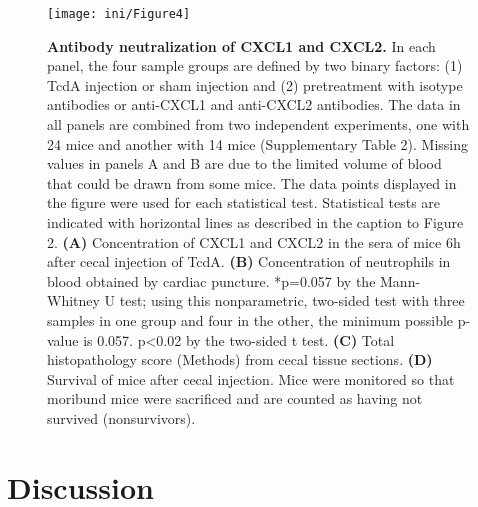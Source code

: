 \begin{figure}[h!]
  \centering
  \texttt{[image: ini/Figure4]}
  \caption[Antibody neutralization of CXCL1 and CXCL2]{
       \textbf{Antibody neutralization of CXCL1 and CXCL2.}
        In each panel, the four sample groups are defined by two binary factors: (1) TcdA injection or sham injection and (2) pretreatment with isotype antibodies or anti-CXCL1 and anti-CXCL2 antibodies. The data in all panels are combined from two independent experiments, one with 24 mice and another with 14 mice (Supplementary Table 2). Missing values in panels A and B are due to the limited volume of blood that could be drawn from some mice. The data points displayed in the figure were used for each statistical test. Statistical tests are indicated with horizontal lines as described in the caption to Figure 2. \textbf{(A)} Concentration of CXCL1 and CXCL2 in the sera of mice 6h after cecal injection of TcdA. \textbf{(B)} Concentration of neutrophils in blood obtained by cardiac puncture. *p=0.057 by the Mann-Whitney U test; using this nonparametric, two-sided test with three samples in one group and four in the other, the minimum possible p-value is 0.057. p<0.02 by the two-sided t test. \textbf{(C)} Total histopathology score (Methods) from cecal tissue sections. \textbf{(D)} Survival of mice after cecal injection. Mice were monitored so that moribund mice were sacrificed and are counted as having not survived (nonsurvivors). 
  }
  \label{ini:fig4}
\end{figure}


\section{Discussion}

